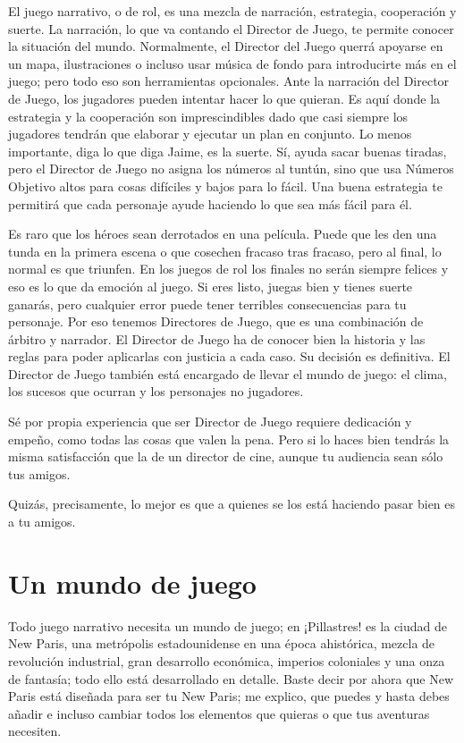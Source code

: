 El juego narrativo, o de rol, es una mezcla de narración, estrategia, cooperación y suerte. La narración, lo que va contando el Director de Juego, te permite conocer la situación del mundo. Normalmente, el Director del Juego querrá apoyarse en un mapa, ilustraciones o incluso usar música de fondo para introducirte más en el juego; pero todo eso son herramientas opcionales. Ante la narración del Director de Juego, los jugadores pueden intentar hacer lo que quieran. Es aquí donde la estrategia y la cooperación son imprescindibles dado que casi siempre los jugadores tendrán que elaborar y ejecutar un plan en conjunto. Lo menos importante, diga lo que diga Jaime, es la suerte. Sí, ayuda sacar buenas tiradas, pero el Director de Juego no asigna los números al tuntún, sino que usa Números Objetivo altos para cosas difíciles y bajos para lo fácil. Una buena estrategia te permitirá que cada personaje ayude haciendo lo que sea más fácil para él.

Es raro que los héroes sean derrotados en una película. Puede que les den una tunda en la primera escena o que cosechen fracaso tras fracaso, pero al final, lo normal es que triunfen. En los juegos de rol los finales no serán siempre felices y eso es lo que da emoción al juego. Si eres listo, juegas bien y tienes suerte ganarás, pero cualquier error puede tener terribles consecuencias para tu personaje.
Por eso tenemos Directores de Juego, que es una combinación de árbitro y narrador. El Director de Juego ha de conocer bien la historia y las reglas para poder aplicarlas con justicia a cada caso. Su decisión es definitiva. El Director de Juego también está encargado de llevar el mundo de juego: el clima, los sucesos que ocurran y los personajes no jugadores.

Sé por propia experiencia que ser Director de Juego requiere dedicación y empeño, como todas las cosas que valen la pena. Pero si lo haces bien tendrás la misma satisfacción que la de un director de cine, aunque tu audiencia sean sólo tus amigos.

Quizás, precisamente, lo mejor es que a quienes se los está haciendo pasar bien es a tu amigos.

\section{Un mundo de juego}%

Todo juego narrativo necesita un mundo de juego; en ¡Pillastres! es la ciudad de New Paris, una metrópolis estadounidense en una época ahistórica, mezcla de revolución industrial, gran desarrollo económica, imperios coloniales y una onza de fantasía; todo ello está desarrollado en detalle. Baste decir por ahora que New Paris está diseñada para ser tu New Paris; me explico, que puedes y hasta debes añadir e incluso cambiar todos los elementos que quieras o que tus aventuras necesiten.


